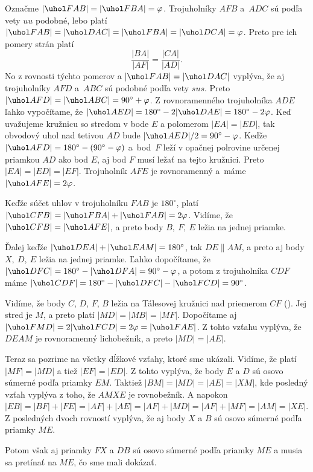 {%
Označme $|\uhol FAB|=|\uhol FBA|=\varphi$. Trojuholníky $AFB$ a~$ADC$ sú podľa vety $uu$ podobné, lebo platí $|\uhol FAB|=|\uhol DAC|=|\uhol FBA|=|\uhol DCA|=\varphi$. Preto pre ich pomery strán platí $$\frac{|BA|}{|AF|}=\frac{|CA|}{|AD|}.$$
No z rovnosti týchto pomerov a $|\uhol FAB|=|\uhol DAC|$ vyplýva, že aj trojuholníky $AFD$ a~$ABC$ sú podobné podľa vety $sus$. Preto $|\uhol AFD|=|\uhol ABC|=90^\circ+\varphi$.
Z rovnoramenného trojuholníka $ADE$ ľahko vypočítame, že $|\uhol AED|=180^\circ-2|\uhol DAE|=180^\circ-2\varphi$. Keď uvažujeme kružnicu so stredom v bode $E$ a polomerom $|EA|=|ED|$, tak obvodový uhol nad tetivou $AD$ bude $|\uhol AED|/2=90^\circ-\varphi$. Keďže $|\uhol AFD|=180^\circ-(90^\circ-\varphi)$ a~bod~$F$ leží v opačnej polrovine určenej priamkou $AD$ ako bod $E$, aj bod $F$ musí ležať na tejto kružnici. Preto $|EA|=|ED|=|EF|$. Trojuholník $AFE$ je rovnoramenný a~máme $|\uhol AFE|=2\varphi$.

Keďže súčet uhlov v trojuholníku $FAB$ je $180^\circ$, platí $|\uhol CFB |=|\uhol FBA |+|\uhol FAB |=2\varphi$. Vidíme, že $|\uhol CFB|= |\uhol AFE |$, a preto body $B,\ F,\ E$ ležia na jednej priamke.

Ďalej keďže $|\uhol DEA |+|\uhol EAM |=180^\circ$, tak $DE\parallel AM$, a preto aj body $X,\ D,\ E$ ležia na jednej priamke. Ľahko dopočítame, že $|\uhol DFC |=180^\circ-|\uhol DFA |=90^\circ-\varphi$, a potom z trojuholníka $CDF$ máme $|\uhol CDF |=180^\circ-|\uhol DFC |-|\uhol FCD |=90^\circ$.

Vidíme, že body $C$, $D$, $F$, $B$ ležia na Tálesovej kružnici nad priemerom $CF$ (\obr). Jej stred je $M$, a preto platí $|MD|=|MB|=|MF|$. Dopočítame aj $|\uhol FMD |=2|\uhol FCD |=2\varphi=|\uhol FAE |$. Z tohto vzťahu vyplýva, že $DEAM$ je rovnoramenný lichobežník, a preto $|MD|=|AE|$.
%

Teraz sa pozrime na všetky dĺžkové vzťahy, ktoré sme ukázali. Vidíme, že platí $|MF|=|MD|$ a tiež $|EF|=|ED|$. Z tohto vyplýva, že body $E$ a $D$ sú osovo súmerné podľa priamky $EM$. Taktiež $|BM|=|MD|=|AE|=|XM|$, kde posledný vzťah vyplýva z toho, že $AMXE$ je rovnobežník. A napokon $|EB|=|BF|+|FE|=|AF|+|AE|=|AF|+|MD|=|AF|+|MF|=|AM|=|XE|$. Z posledných dvoch rovností vyplýva, že aj body $X$ a $B$ sú osovo súmerné podľa priamky $ME$.

Potom však aj priamky $FX$ a $DB$ sú osovo súmerné podľa priamky $ME$ a musia sa pretínať na $ME$, čo sme mali dokázať.
}

